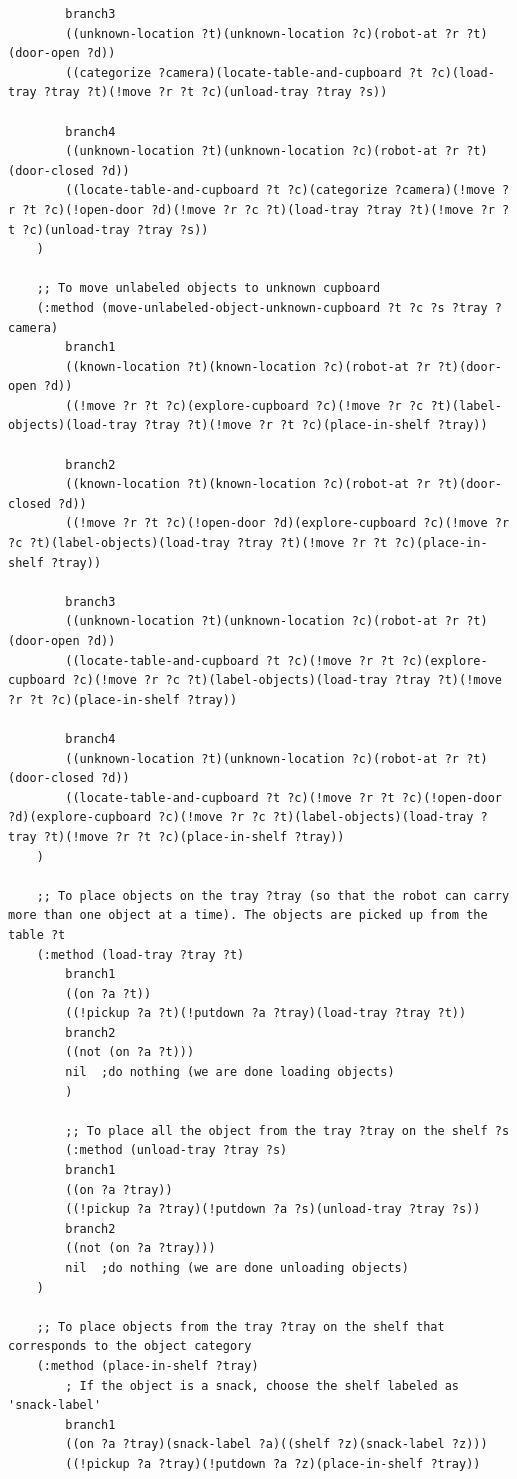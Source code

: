 \documentclass[paper=a4, fontsize=11pt]{scrartcl}
\begin{document}
\begin{lstlisting}
		branch3
		((unknown-location ?t)(unknown-location ?c)(robot-at ?r ?t)(door-open ?d))
		((categorize ?camera)(locate-table-and-cupboard ?t ?c)(load-tray ?tray ?t)(!move ?r ?t ?c)(unload-tray ?tray ?s))
		
		branch4
		((unknown-location ?t)(unknown-location ?c)(robot-at ?r ?t)(door-closed ?d))
		((locate-table-and-cupboard ?t ?c)(categorize ?camera)(!move ?r ?t ?c)(!open-door ?d)(!move ?r ?c ?t)(load-tray ?tray ?t)(!move ?r ?t ?c)(unload-tray ?tray ?s))
	)
	
	;; To move unlabeled objects to unknown cupboard
	(:method (move-unlabeled-object-unknown-cupboard ?t ?c ?s ?tray ?camera)
		branch1
		((known-location ?t)(known-location ?c)(robot-at ?r ?t)(door-open ?d))
		((!move ?r ?t ?c)(explore-cupboard ?c)(!move ?r ?c ?t)(label-objects)(load-tray ?tray ?t)(!move ?r ?t ?c)(place-in-shelf ?tray))
		
		branch2
		((known-location ?t)(known-location ?c)(robot-at ?r ?t)(door-closed ?d))
		((!move ?r ?t ?c)(!open-door ?d)(explore-cupboard ?c)(!move ?r ?c ?t)(label-objects)(load-tray ?tray ?t)(!move ?r ?t ?c)(place-in-shelf ?tray))
		
		branch3
		((unknown-location ?t)(unknown-location ?c)(robot-at ?r ?t)(door-open ?d))
		((locate-table-and-cupboard ?t ?c)(!move ?r ?t ?c)(explore-cupboard ?c)(!move ?r ?c ?t)(label-objects)(load-tray ?tray ?t)(!move ?r ?t ?c)(place-in-shelf ?tray))
		
		branch4
		((unknown-location ?t)(unknown-location ?c)(robot-at ?r ?t)(door-closed ?d))
		((locate-table-and-cupboard ?t ?c)(!move ?r ?t ?c)(!open-door ?d)(explore-cupboard ?c)(!move ?r ?c ?t)(label-objects)(load-tray ?tray ?t)(!move ?r ?t ?c)(place-in-shelf ?tray))
	)
	
	;; To place objects on the tray ?tray (so that the robot can carry more than one object at a time). The objects are picked up from the table ?t
	(:method (load-tray ?tray ?t)
		branch1
		((on ?a ?t))
		((!pickup ?a ?t)(!putdown ?a ?tray)(load-tray ?tray ?t))
		branch2
		((not (on ?a ?t)))
		nil  ;do nothing (we are done loading objects)
		)
		
		;; To place all the object from the tray ?tray on the shelf ?s
		(:method (unload-tray ?tray ?s)
		branch1
		((on ?a ?tray))
		((!pickup ?a ?tray)(!putdown ?a ?s)(unload-tray ?tray ?s))
		branch2
		((not (on ?a ?tray)))
		nil  ;do nothing (we are done unloading objects)
	)
	
	;; To place objects from the tray ?tray on the shelf that corresponds to the object category
	(:method (place-in-shelf ?tray)
		; If the object is a snack, choose the shelf labeled as 'snack-label'
		branch1
		((on ?a ?tray)(snack-label ?a)((shelf ?z)(snack-label ?z)))
		((!pickup ?a ?tray)(!putdown ?a ?z)(place-in-shelf ?tray))
		

\end{lstlisting}
\end{document}
